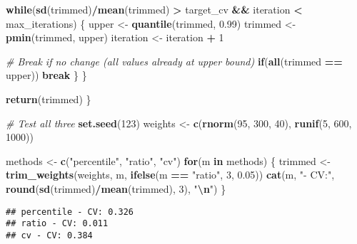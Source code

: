 \documentclass[
]{article}
\newenvironment{Shaded}{\begin{snugshade}}{\end{snugshade}}
\newcommand{\CommentTok}[1]{\textcolor[rgb]{0.56,0.35,0.01}{\textit{#1}}}
\newcommand{\ControlFlowTok}[1]{\textcolor[rgb]{0.13,0.29,0.53}{\textbf{#1}}}
\newcommand{\DecValTok}[1]{\textcolor[rgb]{0.00,0.00,0.81}{#1}}
\newcommand{\FloatTok}[1]{\textcolor[rgb]{0.00,0.00,0.81}{#1}}
\newcommand{\FunctionTok}[1]{\textcolor[rgb]{0.13,0.29,0.53}{\textbf{#1}}}
\newcommand{\NormalTok}[1]{#1}
\newcommand{\OtherTok}[1]{\textcolor[rgb]{0.56,0.35,0.01}{#1}}
\newcommand{\SpecialCharTok}[1]{\textcolor[rgb]{0.81,0.36,0.00}{\textbf{#1}}}
\newcommand{\StringTok}[1]{\textcolor[rgb]{0.31,0.60,0.02}{#1}}
\begin{document}
\begin{Shaded}
\begin{Highlighting}[]
    \ControlFlowTok{while}\NormalTok{(}\FunctionTok{sd}\NormalTok{(trimmed)}\SpecialCharTok{/}\FunctionTok{mean}\NormalTok{(trimmed) }\SpecialCharTok{\textgreater{}}\NormalTok{ target\_cv }\SpecialCharTok{\&\&}\NormalTok{ iteration }\SpecialCharTok{\textless{}}\NormalTok{ max\_iterations) \{}
\NormalTok{      upper }\OtherTok{\textless{}{-}} \FunctionTok{quantile}\NormalTok{(trimmed, }\FloatTok{0.99}\NormalTok{)}
\NormalTok{      trimmed }\OtherTok{\textless{}{-}} \FunctionTok{pmin}\NormalTok{(trimmed, upper)}
\NormalTok{      iteration }\OtherTok{\textless{}{-}}\NormalTok{ iteration }\SpecialCharTok{+} \DecValTok{1}
      
      \CommentTok{\# Break if no change (all values already at upper bound)}
      \ControlFlowTok{if}\NormalTok{(}\FunctionTok{all}\NormalTok{(trimmed }\SpecialCharTok{==}\NormalTok{ upper)) }\ControlFlowTok{break}
\NormalTok{    \}}
\NormalTok{  \}}
  
  \FunctionTok{return}\NormalTok{(trimmed)}
\NormalTok{\}}

\CommentTok{\# Test all three}
\FunctionTok{set.seed}\NormalTok{(}\DecValTok{123}\NormalTok{)}
\NormalTok{weights }\OtherTok{\textless{}{-}} \FunctionTok{c}\NormalTok{(}\FunctionTok{rnorm}\NormalTok{(}\DecValTok{95}\NormalTok{, }\DecValTok{300}\NormalTok{, }\DecValTok{40}\NormalTok{), }\FunctionTok{runif}\NormalTok{(}\DecValTok{5}\NormalTok{, }\DecValTok{600}\NormalTok{, }\DecValTok{1000}\NormalTok{))}

\NormalTok{methods }\OtherTok{\textless{}{-}} \FunctionTok{c}\NormalTok{(}\StringTok{"percentile"}\NormalTok{, }\StringTok{"ratio"}\NormalTok{, }\StringTok{"cv"}\NormalTok{)}
\ControlFlowTok{for}\NormalTok{(m }\ControlFlowTok{in}\NormalTok{ methods) \{}
\NormalTok{  trimmed }\OtherTok{\textless{}{-}} \FunctionTok{trim\_weights}\NormalTok{(weights, m, }\FunctionTok{ifelse}\NormalTok{(m }\SpecialCharTok{==} \StringTok{"ratio"}\NormalTok{, }\DecValTok{3}\NormalTok{, }\FloatTok{0.05}\NormalTok{))}
  \FunctionTok{cat}\NormalTok{(m, }\StringTok{"{-} CV:"}\NormalTok{, }\FunctionTok{round}\NormalTok{(}\FunctionTok{sd}\NormalTok{(trimmed)}\SpecialCharTok{/}\FunctionTok{mean}\NormalTok{(trimmed), }\DecValTok{3}\NormalTok{), }\StringTok{"}\SpecialCharTok{\textbackslash{}n}\StringTok{"}\NormalTok{)}
\NormalTok{\}}
\end{Highlighting}
\end{Shaded}

\begin{verbatim}
## percentile - CV: 0.326 
## ratio - CV: 0.011 
## cv - CV: 0.384
\end{verbatim}
\end{document}
